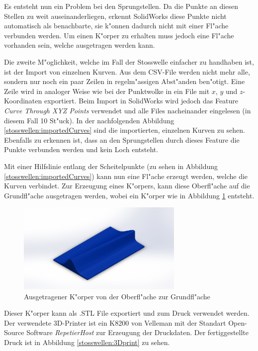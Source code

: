 \begin{refsection}
Es entsteht nun ein Problem bei den Sprungstellen. Da die Punkte an diesen
Stellen zu weit auseinanderliegen, erkennt SolidWorks diese Punkte nicht
automatisch als benachbarte, sie k"onnen dadurch nicht mit einer Fl"ache
verbunden werden. Um einen K"orper zu erhalten muss jedoch eine Fl"ache
vorhanden sein, welche ausgetragen werden kann. 

Die zweite M"oglichkeit, welche im Fall der Stosswelle einfacher
zu handhaben ist, ist der Import von einzelnen Kurven. Aus dem
CSV-File werden nicht mehr alle, sondern nur noch ein paar Zeilen in
regelm"assigen Abst"anden ben"otigt. Eine Zeile wird in analoger Weise
wie bei der Punktwolke in ein File mit $x$, $y$ und $z$-Koordinaten
exportiert. Beim Import in SolidWorks wird jedoch das Feature
\textit{Curve Through XYZ Points} verwendet und alle Files nacheinander
eingelesen (in diesem Fall 10 St"uck). In der nachfolgenden Abbildung
\ref{stosswellen:importedCurves} sind die importierten, einzelnen Kurven
zu sehen. Ebenfalls zu erkennen ist, dass an den Sprungstellen durch
dieses Feature die Punkte verbunden werden und kein Loch entsteht. 

Mit einer Hilfslinie entlang der Scheitelpunkte (zu sehen in Abbildung
\ref{stosswellen:importedCurves}) kann nun eine Fl"ache erzeugt werden,
welche die Kurven verbindet. Zur Erzeugung eines K"orpers, kann diese
Oberfl"ache auf die Grundfl"ache ausgetragen werden, wobei ein K"orper
wie in Abbildung \ref{stosswellen:solid} entsteht.
\begin{figure}
	\begin{center}
		\includegraphics[width=8cm]{stosswellen/Solid.JPG}
	\end{center}
	\caption{Ausgetragener K"orper von der Oberfl"ache zur Grundfl"ache}
\label{stosswellen:solid}
\end{figure}

Dieser K"orper kann als .STL File exportiert und zum Druck verwendet
werden. 
Der verwendete 3D-Printer ist ein K8200 von Velleman mit der
Standart Open-Source Software \textit{RepetierHost} zur Erzeugung
der Druckdaten. Der fertiggestellte Druck ist in Abbildung
\ref{stosswellen:3Dprint} zu sehen.
\printbibliography[heading=subbibliography]
\end{refsection}
